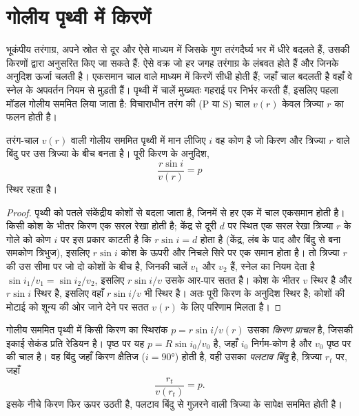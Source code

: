 \section{गोलीय पृथ्वी में किरणें}

भूकंपीय तरंगाग्र, अपने स्रोत से दूर और ऐसे माध्यम में जिसके गुण
तरंगदैर्घ्य भर में धीरे बदलते हैं, उसकी किरणों द्वारा अनुसरित किए जा सकते हैं: ऐसे वक्र
जो हर जगह तरंगाग्र के लंबवत होते हैं और जिनके अनुदिश ऊर्जा चलती है।
एकसमान चाल वाले माध्यम में किरणें सीधी होती हैं; जहाँ चाल बदलती है वहाँ वे
स्नेल के अपवर्तन नियम से मुड़ती हैं। पृथ्वी में चालें मुख्यतः
गहराई पर निर्भर करती हैं, इसलिए पहला मॉडल गोलीय सममित लिया जाता है: विचाराधीन तरंग की
(P या S) चाल $v(r)$ केवल त्रिज्या $r$ का फलन होती है।

\begin{theorem}[गोलीय पृथ्वी में स्नेल का नियम]\label{thm:b3:seismology-imaging:snell}
तरंग-चाल $v(r)$ वाली गोलीय सममित पृथ्वी में मान लीजिए $i$ वह कोण है
जो किरण और त्रिज्या $r$ वाले बिंदु पर उस त्रिज्या के बीच बनता है। पूरी किरण के अनुदिश,
\[
  \frac{r\sin i}{v(r)} = p
\]
स्थिर रहता है।
\end{theorem}

\begin{proof}
पृथ्वी को पतले संकेंद्रीय कोशों से बदला जाता है, जिनमें से हर एक में चाल एकसमान होती है। किसी
कोश के भीतर किरण एक सरल रेखा होती है; केंद्र से दूरी $d$ पर स्थित एक सरल रेखा
त्रिज्या $r$ के गोले को कोण $i$ पर इस प्रकार काटती है कि
$r\sin i = d$ होता है (केंद्र, लंब के पाद और बिंदु से बना समकोण
त्रिभुज), इसलिए $r\sin i$ कोश के ऊपरी और निचले सिरे पर एक समान होता है। तो
त्रिज्या $r$ की उस सीमा पर जो दो कोशों के बीच है, जिनकी
चालें $v_1$ और $v_2$ हैं, स्नेल का नियम देता है $\sin i_1/v_1 = \sin i_2/v_2$, इसलिए
$r\sin i/v$ उसके आर-पार सतत है। कोश के भीतर $v$ स्थिर है और
$r\sin i$ स्थिर है, इसलिए वहाँ $r\sin i/v$ भी स्थिर है। अतः
पूरी किरण के अनुदिश स्थिर है; कोशों की मोटाई को
शून्य की ओर जाने देने पर सतत $v(r)$ के लिए परिणाम मिलता है।
\end{proof}

\begin{definition}[किरण प्राचल, पलटाव बिंदु]\label{def:b3:seismology-imaging:ray-parameter}
गोलीय सममित पृथ्वी में किसी किरण का स्थिरांक $p = r\sin i/v(r)$
उसका \emph{किरण प्राचल} है, जिसकी इकाई सेकंड प्रति रेडियन है।
पृष्ठ पर यह $p = R\sin i_0/v_0$ है, जहाँ $i_0$ निर्गम-कोण है और $v_0$
पृष्ठ पर की चाल है। वह बिंदु जहाँ किरण क्षैतिज ($i = \ang{90}$) होती है,
वही उसका \emph{पलटाव बिंदु} है,
त्रिज्या $r_t$ पर, जहाँ
\[
  \frac{r_t}{v(r_t)} = p .
\]
इसके नीचे किरण फिर ऊपर उठती है, पलटाव बिंदु से गुज़रने वाली
त्रिज्या के सापेक्ष सममित होती है।
\end{definition}

